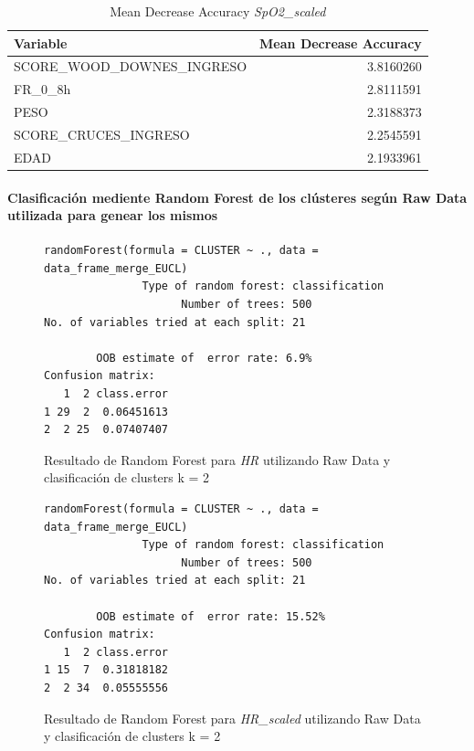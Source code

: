 \begin{table}[H]
    \centering
    \begin{tabular}{lr}
        \toprule
        \textbf{Variable} & \textbf{Mean Decrease Accuracy} \\
        \midrule
        SCORE\_WOOD\_DOWNES\_INGRESO & 3.8160260 \\
        FR\_0\_8h & 2.8111591 \\
        PESO & 2.3188373 \\
        SCORE\_CRUCES\_INGRESO & 2.2545591 \\
        EDAD & 2.1933961 \\
        \bottomrule
    \end{tabular}
    \caption{Mean Decrease Accuracy \textit{SpO2\_scaled}}
\end{table}


\paragraph{Clasificación mediente Random Forest de los clústeres según Raw Data utilizada para genear los mismos} 

\begin{figure}[H]
    \centering
    \begin{lstlisting}[frame=single, basicstyle=\small\ttfamily]
        randomForest(formula = CLUSTER ~ ., data = data_frame_merge_EUCL) 
               Type of random forest: classification
                     Number of trees: 500
No. of variables tried at each split: 21

        OOB estimate of  error rate: 6.9%
Confusion matrix:
   1  2 class.error
1 29  2  0.06451613
2  2 25  0.07407407
    \end{lstlisting}
    \caption{Resultado de Random Forest para \textit{HR} utilizando Raw Data y clasificación de clusters k = 2}\label{fig:random_forest_eucl_result_RF_1}
\end{figure}
\begin{figure}[H]
    \centering
    \begin{lstlisting}[frame=single, basicstyle=\small\ttfamily]
        randomForest(formula = CLUSTER ~ ., data = data_frame_merge_EUCL) 
               Type of random forest: classification
                     Number of trees: 500
No. of variables tried at each split: 21

        OOB estimate of  error rate: 15.52%
Confusion matrix:
   1  2 class.error
1 15  7  0.31818182
2  2 34  0.05555556
    \end{lstlisting}
    \caption{Resultado de Random Forest para \textit{HR\_scaled} utilizando Raw Data y clasificación de clusters k = 2}
    \label{fig:random_forest_eucl_result_RF_2}
\end{figure}

